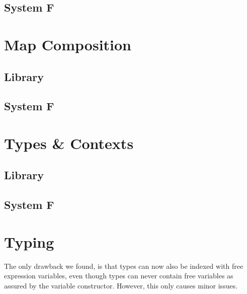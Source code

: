 \documentclass[sigplan,10pt]{acmart}
\newenvironment{LibCode*}{%
  \begin{tcolorbox}[%
    colframe=white,%
    boxrule=0.0pt,%
    top=2.5pt,%
    left=2.5pt,%
    bottom=2.5pt,%
    right=2.5pt,%
    boxsep=0pt%
  ]\vspace{-0.2\baselineskip}%
}{%
  \vspace{-1\baselineskip}%
  \end{tcolorbox}%
}
\newcommand*\LibCode[1]{\begin{LibCode*}{#1}\end{LibCode*}}
\newcommand*\AppCode[1]{{#1}}
\begin{document}
  \subsection{System F}
  \AppCode\FTraversalOp
  \AppCode\FTraversalId
  \AppCode\FTraversalIdProofInteresting
  \AppCode\FTraversal

  \section{Map Composition}
  \subsection{Library}
  \LibCode\KWkKit
  \LibCode\KWkKitInstances
  \LibCode\KComposeKit
  \LibCode\KComposition
  \LibCode\KComposeKitAp
  \LibCode\KDistLiftCompose
  \LibCode\KComposeKitNotation
  \LibCode\KComposeTraversal
  \LibCode\KCommLiftWeaken
  \LibCode\KCommLiftWeakenTraverse
  \LibCode\KComposeKitInstances
  \LibCode\KComposeKitInstancesConcrete
  \LibCode\KWeakenCancelsSingle
  \LibCode\KWeakenCancelsSingleTraverse
  \LibCode\KDistLiftSingle
  \LibCode\KDistLiftSingleTraverse
  \subsection{System F}
  \AppCode\FAssoc
  \AppCode\FAssocProofInteresting
  \AppCode\FComposeTraversal

  \section{Types \& Contexts}
  \subsection{Library}
  \LibCode\KTypeSorts
  \LibCode\KTypes
  \LibCode\KContextHelper
  \LibCode\KContexts
  \LibCode\KContextLookup
  \subsection{System F}
  \AppCode\FTypes

  \section{Typing}
  The only drawback we found, is that types can now also be indexed
  with free expression variables, even though types can never contain
  free variables as assured by the variable constructor. However, this
  only causes minor issues.
\end{document}
